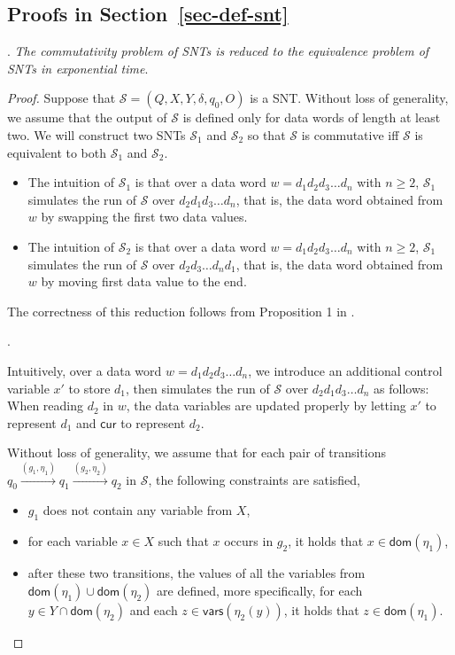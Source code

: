 \documentclass[runningheads,a4paper]{llncs}
\def\Ss{{\mathcal{S} }}
\newcommand\cur{\mathsf{cur}}
\newcommand\vars{\mathsf{vars}}
\newcommand\dom{\mathsf{dom}}
\begin{document}
\begin{appendix}

\section{Proofs in Section~\ref{sec-def-snt}}

. 
\emph{The commutativity problem of SNTs is reduced to the equivalence problem of SNTs in exponential time}.

\begin{proof}
Suppose that $\Ss=(Q, X, Y, \delta, q_0, O)$ is a SNT. Without loss of generality, we assume that the output of $\Ss$ is defined only for data words of length at least two. We will construct two SNTs $\Ss_1$ and $\Ss_2$ so that $\Ss$ is commutative iff $\Ss$ is equivalent to both $\Ss_1$ and $\Ss_2$.
\begin{itemize}
\item The intuition of $\Ss_1$ is that over a data word $w=d_1 d_2 d_3 \dots d_n$ with $n\ge 2$, $\Ss_1$ simulates the run of $\Ss$ over $d_2 d_1 d_3 \dots d_n$, that is, the data word obtained from $w$ by swapping the first two data values.
%
\item The intuition of $\Ss_2$ is that over a data word $w=d_1 d_2 d_3 \dots d_n$ with $n\ge 2$, $\Ss_1$ simulates the run of $\Ss$ over $d_2 d_3 \dots d_n d_1$, that is, the data word obtained from $w$ by moving first data value to the end. 
\end{itemize}
The correctness of this reduction follows from Proposition 1 in \cite{CHSW15}.

\smallskip

\noindent {\it The construction of $\Ss_1$}.

Intuitively, over a data word $w=d_1d_2 d_3 \dots d_n$, we introduce an additional control variable $x'$ to store $d_1$, then simulates the run of $\Ss$ over $d_2 d_1 d_3 \dots d_n$ as follows: When reading $d_2$ in $w$, the data variables are updated properly by letting $x'$ to represent $d_1$ and $\cur$ to represent $d_2$.

Without loss of generality, we assume that for each pair of transitions $q_0 \xrightarrow{(g_1,\eta_1)} q_1 \xrightarrow{(g_2,\eta_2)} q_2$ in $\Ss$, the following constraints are satisfied,
\begin{itemize}
\item $g_1$ does not contain any variable from $X$,
%
\item for each variable $x \in X$ such that $x$ occurs in $g_2$, it holds that $x \in \dom(\eta_1)$,
%
\item after these two transitions, the values of all the variables from $\dom(\eta_1) \cup \dom(\eta_2)$ are defined, more specifically, for each $y \in Y \cap \dom(\eta_2)$ and each $z \in \vars(\eta_2(y))$, it holds that $z \in \dom(\eta_1)$.
\end{itemize}


\end{proof}
\end{appendix}
\end{document}
